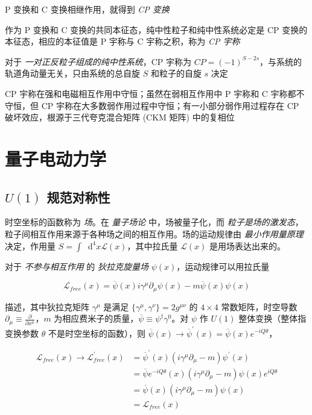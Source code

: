 \documentclass[oneside,a4paper,openany,11pt]{ctexbook}
\newcommand*{\dif}{\mathop{}\!\mathrm{d}} %
\begin{document}
P 变换和 C 变换相继作用，就得到 \emph{CP 变换}

作为 P 变换和 C 变换的共同本征态，纯中性粒子和纯中性系统必定是 CP 变换的本征态，相应的本征值是 P 宇称与 C 宇称之积，称为 \emph{CP 宇称}

对于 \emph{一对正反粒子组成的纯中性系统}，CP 宇称为 $CP = (-1)^{S-2s}$，与系统的轨道角动量无关，只由系统的总自旋 $S$ 和粒子的自旋 $s$ 决定

CP 宇称在强和电磁相互作用中守恒；虽然在弱相互作用中 P 宇称和 C 宇称都不守恒，但 CP 宇称在大多数弱作用过程中守恒；有一小部分弱作用过程存在 CP 破坏效应，根源于三代夸克混合矩阵 (CKM 矩阵) 中的复相位

\section{量子电动力学}

\subsection{\texorpdfstring{$U(1)$}{U(1)} 规范对称性}

时空坐标的函数称为 \emph{场}。在 \emph{量子场论} 中，场被量子化，而 \emph{粒子是场的激发态}，粒子间相互作用来源于各种场之间的相互作用。场的运动规律由 \emph{最小作用量原理} 决定，作用量 $S=\int \dif^4 x \mathcal{L}(x)$，其中拉氏量 $\mathcal{L}(x)$ 是用场表达出来的。

对于 \emph{不参与相互作用} 的 \emph{狄拉克旋量场} $\psi(x)$，运动规律可以用拉氏量

\begin{equation}
    \mathcal{L}_{free}(x) = \overline{\psi}(x) i \gamma^\mu \partial_\mu \psi(x) - m \overline{\psi}(x) \psi(x)
\end{equation}

描述，其中狄拉克矩阵 $\gamma^\mu$ 是满足 $\{\gamma^\mu, \gamma^\nu\}=2 g^{\mu\nu}$ 的 $4 \times 4$ 常数矩阵，时空导数 $\partial_\mu \equiv \frac{\partial}{\partial x^\mu}$，$m$ 为相应费米子的质量，$\overline{\psi} \equiv \psi^\dagger \gamma^0$。对 $\psi$ 作 $U(1)$ 整体变换（整体指变换参数 $\theta$ 不是时空坐标的函数），则 $\overline{\psi}(x) \to \overline{\psi}^\prime (x) = \overline{\psi}(x) e^{-iQ\theta}$，

\begin{align}
    \mathcal{L}_{free} (x) \to \mathcal{L}_{free}^\prime (x) &= \overline{\psi}^\prime (x) (i \gamma^\mu \partial_\mu - m) \psi^\prime(x) \\
    &= \overline{\psi} e^{-iQ\theta} (x) (i \gamma^\mu \partial_\mu - m) \psi(x) e^{iQ\theta} \\
    &= \overline{\psi}(x) (i \gamma^\mu \partial_\mu - m) \psi(x) \\
    &= \mathcal{L}_{free} (x)
\end{align}
\end{document}
